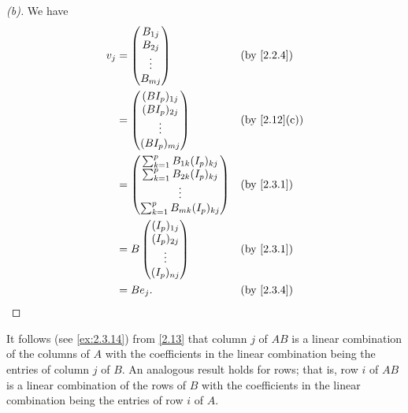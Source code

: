 \begin{proof}[(b)]
  We have
  \begin{align*}
    v_j & = \begin{pmatrix}
              B_{1 j} \\
              B_{2 j} \\
              \vdots  \\
              B_{m j}
            \end{pmatrix}                     &  & \text{(by \cref{2.2.4})}   \\
        & = \begin{pmatrix}
              (B I_p)_{1 j} \\
              (B I_p)_{2 j} \\
              \vdots        \\
              (B I_p)_{m j}
            \end{pmatrix}                     &  & \text{(by \cref{2.12}(c))} \\
        & = \begin{pmatrix}
              \sum_{k = 1}^p B_{1 k} (I_p)_{k j} \\
              \sum_{k = 1}^p B_{2 k} (I_p)_{k j} \\
              \vdots                             \\
              \sum_{k = 1}^p B_{m k} (I_p)_{k j}
            \end{pmatrix} &  & \text{(by \cref{2.3.1})}                       \\
        & = B \begin{pmatrix}
                (I_p)_{1 j} \\
                (I_p)_{2 j} \\
                \vdots      \\
                (I_p)_{n j}
              \end{pmatrix}                   &  & \text{(by \cref{2.3.1})}   \\
        & = B e_j.                              &  & \text{(by \cref{2.3.4})}
  \end{align*}
\end{proof}

\begin{note}
  It follows (see \cref{ex:2.3.14}) from \cref{2.13} that column \(j\) of \(AB\) is a linear combination of the columns of \(A\) with the coefficients in the linear combination being the entries of column \(j\) of \(B\).
  An analogous result holds for rows;
  that is, row \(i\) of \(AB\) is a linear combination of the rows of \(B\) with the coefficients in the linear combination being the entries of row \(i\) of \(A\).
\end{note}

